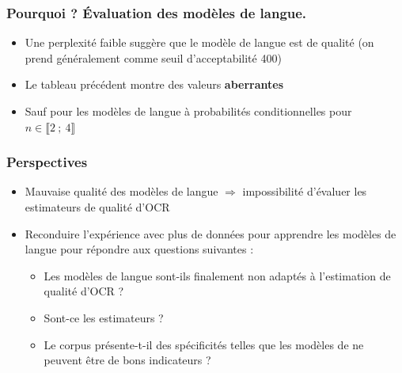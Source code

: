 \documentclass{beamer}
\begin{document}
		\begin{frame}\frametitle{Pourquoi ? \'{E}valuation des modèles de langue.}
		\begin{itemize}
			\item Une perplexité faible suggère que le modèle de langue est de qualité (on prend généralement comme seuil d'acceptabilité 400)
			\item Le tableau précédent montre des valeurs \textbf{aberrantes}
			\item Sauf pour les modèles de langue à probabilités conditionnelles pour $n \in \llbracket 2~;~ 4 \rrbracket$
		\end{itemize}
		\end{frame}

\begin{frame}\frametitle{Perspectives}

\begin{itemize}
	\item Mauvaise qualité des modèles de langue $\Rightarrow$ impossibilité d'évaluer les estimateurs de qualité d'OCR
	\item Reconduire l'expérience avec plus de données pour apprendre les modèles de langue pour répondre aux questions suivantes :
	\begin{itemize}
		\item Les modèles de langue sont-ils finalement non adaptés à l'estimation de qualité d'OCR ?
		\item Sont-ce les estimateurs ?  
		\item Le corpus présente-t-il des spécificités telles que les modèles de ne peuvent être de bons indicateurs ?
	\end{itemize}
\end{itemize}
\end{frame}




 
\end{document}
